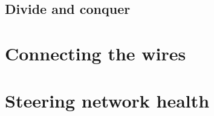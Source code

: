 \documentclass[twocolumn]{article}
\begin{document}
\subsection{Divide and conquer}


\section{Connecting the wires}
\section{Steering network health}


\end{document}
